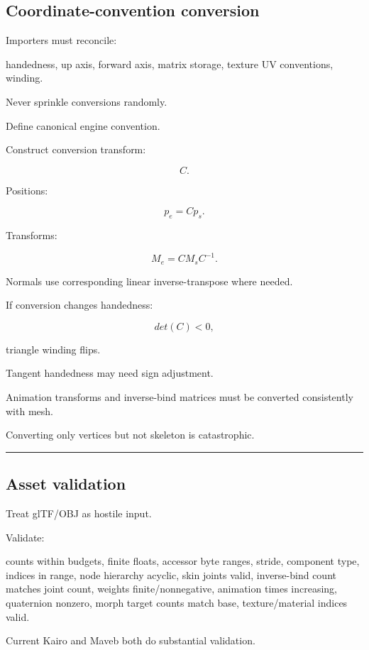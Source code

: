 \subsection{Coordinate-convention conversion}\label{04-visual-computing-ii-ch041-coordinate-convention-conversion}

Importers must reconcile:

handedness, up axis, forward axis, matrix storage, texture UV conventions, winding.

Never sprinkle conversions randomly.

Define canonical engine convention.

Construct conversion transform:

\[
C.
\]

Positions:

\[
p_e=
Cp_s.
\]

Transforms:

\[
\boxed{
M_e=
CM_sC^{-1}.
}
\]

Normals use corresponding linear inverse-transpose where needed.

If conversion changes handedness:

\[
det(C)<0,
\]

triangle winding flips.

Tangent handedness may need sign adjustment.

Animation transforms and inverse-bind matrices must be converted consistently with mesh.

Converting only vertices but not skeleton is catastrophic.

\begin{center}\rule{0.5\linewidth}{0.5pt}\end{center}

\subsection{Asset validation}\label{04-visual-computing-ii-ch041-asset-validation}

Treat glTF/OBJ as hostile input.

Validate:

counts within budgets, finite floats, accessor byte ranges, stride, component type, indices in range, node hierarchy acyclic, skin joints valid, inverse-bind count matches joint count, weights finite/nonnegative, animation times increasing, quaternion nonzero, morph target counts match base, texture/material indices valid.

Current Kairo and Maveb both do substantial validation.

